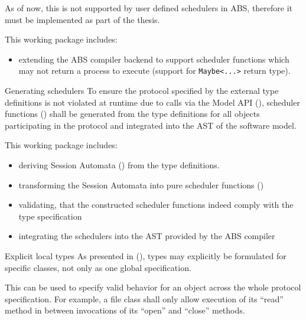 \documentclass[paper=a4,nochapname,accentcolor=tud9c]{tudexercise}
\makeatletter
\newcommand\textcitep[1]{\mkbibparens{\textcite{#1}}}
\def\namedlabel#1#2{\begingroup
    #1%
    \def\@currentlabel{\thedescriptcount}%
    \phantomsection\label{#2}\endgroup
}
\newcounter{descriptcount}
\renewcommand*\thedescriptcount{[\Alph{descriptcount}]}}
\renewcommand*\thedescriptcount{\roman{descriptcount}}}
\makeatother
\begin{document}
\begin{enumdescript}
    As of now, this is not supported by user defined schedulers in ABS,
    therefore it must be implemented as part of the thesis.

    This working package includes:
    \begin{itemize}
      \item extending the ABS compiler backend to support scheduler functions which
        may not return a process to execute (support for \texttt{Maybe<...>}
        return type).
    \end{itemize}
  \item[\namedlabel{Generating schedulers}{WPGenSchedulers}]%
    To ensure the protocol specified by the external type definitions is not
    violated at runtime due to calls via the Model API \textcitep{schlatte2018release}, scheduler functions \textcitep{bjork2013user}
    shall be generated from the type definitions for all objects participating
    in the protocol and integrated into the AST of the software model.

    This working package includes:
    \begin{itemize}
      \item deriving Session Automata \textcitep{kamburjan2016session} from the type definitions.
      \item transforming the Session Automata into pure scheduler functions \textcitep{bjork2013user}
      \item validating, that the constructed scheduler functions indeed comply with the
        type specification
      \item integrating the schedulers into the AST provided by the ABS compiler
    \end{itemize}
  \item[\namedlabel{Explicit local types}{WPExplicitTypes}]%
    As presented in \textcitep{kamburjan2016session}, types may explicitly be
    formulated for specific classes, not only as one global specification.

    This can be used to specify valid behavior for an object across the whole
    protocol specification. For example, a file class shall only allow execution
    of its ``read'' method in between invocations of its ``open'' and ``close'' methods.


\end{enumdescript}
\end{document}
